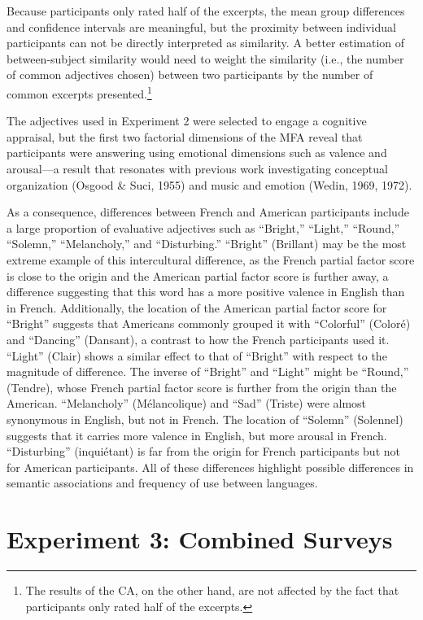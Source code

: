 \documentclass[
  english,
  man]{apa6}
\begin{document}
Because participants only rated half of the excerpts, the mean group differences and confidence intervals are meaningful, but the proximity between individual participants can not be directly interpreted as similarity. A better estimation of between-subject similarity would need to weight the similarity (i.e., the number of common adjectives chosen) between two participants by the number of common excerpts presented.\footnote{The results of the CA, on the other hand, are not affected by the fact that participants only rated half of the excerpts.}

The adjectives used in Experiment 2 were selected to engage a cognitive appraisal, but the first two factorial dimensions of the MFA reveal that participants were answering using emotional dimensions such as valence and arousal---a result that resonates with previous work investigating conceptual organization (Osgood \& Suci, 1955) and music and emotion (Wedin, 1969, 1972).

As a consequence, differences between French and American participants include a large proportion of evaluative adjectives such as ``Bright,'' ``Light,'' ``Round,'' ``Solemn,'' ``Melancholy,'' and ``Disturbing.'' ``Bright'' (Brillant) may be the most extreme example of this intercultural difference, as the French partial factor score is close to the origin and the American partial factor score is further away, a difference suggesting that this word has a more positive valence in English than in French. Additionally, the location of the American partial factor score for ``Bright'' suggests that Americans commonly grouped it with ``Colorful'' (Coloré) and ``Dancing'' (Dansant), a contrast to how the French participants used it. ``Light'' (Clair) shows a similar effect to that of ``Bright'' with respect to the magnitude of difference. The inverse of ``Bright'' and ``Light'' might be ``Round,'' (Tendre), whose French partial factor score is further from the origin than the American. ``Melancholy'' (Mélancolique) and ``Sad'' (Triste) were almost synonymous in English, but not in French. The location of ``Solemn'' (Solennel) suggests that it carries more valence in English, but more arousal in French. ``Disturbing'' (inquiétant) is far from the origin for French participants but not for American participants. All of these differences highlight possible differences in semantic associations and frequency of use between languages.

\hypertarget{experiment-3-combined-surveys}{%
\section{Experiment 3: Combined Surveys}\label{experiment-3-combined-surveys}}
\end{document}
